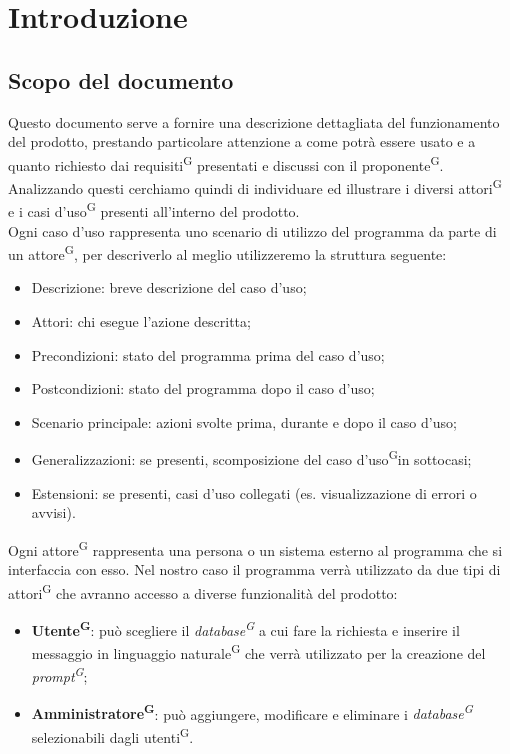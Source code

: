 \section{Introduzione}
\subsection{Scopo del documento}
Questo documento serve a fornire una descrizione dettagliata del funzionamento del prodotto, prestando particolare attenzione a come potrà essere usato e a quanto richiesto dai requisiti\textsuperscript{G} presentati e discussi con il proponente\textsuperscript{G}.
Analizzando questi cerchiamo quindi di individuare ed illustrare i diversi attori\textsuperscript{G} e i casi d’uso\textsuperscript{G} presenti all’interno del prodotto.\\
Ogni caso d’uso rappresenta uno scenario di utilizzo del programma da parte di un attore\textsuperscript{G}, per descriverlo al meglio utilizzeremo la struttura seguente:
\begin{itemize}
	\item Descrizione: breve descrizione del caso d'uso;
	\item Attori: chi esegue l'azione descritta;
	\item Precondizioni: stato del programma prima del caso d'uso;
	\item Postcondizioni: stato del programma dopo il caso d'uso;
	\item Scenario principale: azioni svolte prima, durante e dopo il caso d'uso;
	\item Generalizzazioni: se presenti, scomposizione del caso d'uso\textsuperscript{G}in sottocasi;
	\item Estensioni: se presenti, casi d'uso collegati (es. visualizzazione di errori o avvisi).
\end{itemize}
Ogni attore\textsuperscript{G} rappresenta una persona o un sistema esterno al programma che si interfaccia con esso.
Nel nostro caso il programma verrà utilizzato da due tipi di attori\textsuperscript{G} che avranno accesso a diverse funzionalità del prodotto:
\begin{itemize}
	\item \textbf{Utente\textsuperscript{G}}: può scegliere il \textit{database\textsuperscript{G}} a cui fare la richiesta e inserire il messaggio in linguaggio naturale\textsuperscript{G} che verrà utilizzato per la creazione del \textit{prompt\textsuperscript{G}};
	\item \textbf{Amministratore\textsuperscript{G}}: può aggiungere, modificare e eliminare i \textit{database\textsuperscript{G}} selezionabili dagli utenti\textsuperscript{G}.
\end{itemize} %

